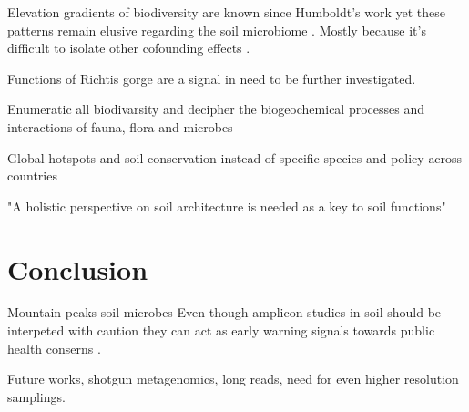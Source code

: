 \documentclass[unnumsec,webpdf,contemporary,large]{oup-authoring-template}%
\theoremstyle{thmstyleone}%
\theoremstyle{thmstyletwo}%
\theoremstyle{thmstylethree}%
\begin{document}
Elevation gradients of biodiversity are known since Humboldt's work \cite{Rahbek2019} 
yet these patterns remain elusive regarding the soil microbiome \cite{Looby2020, Siles2023}.
Mostly because it's difficult to isolate other cofounding effects \cite{Nottingham2018}. 

Functions of Richtis gorge are a signal in need to be further investigated.

Enumeratic all biodivarsity \cite{Anthony2023} and decipher the biogeochemical 
processes and interactions of fauna, flora and microbes \cite{Fry2019, Crowther2019,GRANDY201640,Delgado-Baquerizo2020}

Global hotspots \cite{Guerra2022}
and soil conservation instead of specific species \cite{Guerra2021}
and policy \cite{KONINGER2022} across countries \cite{Putten2023}

"A holistic perspective on soil architecture is needed as a key to soil functions"
\section{Conclusion}

Mountain peaks soil microbes \cite{Adamczyk2019}
Even though amplicon studies in soil should be interpeted with caution \cite{alteio2021} they 
can act as early warning signals towards public health conserns \cite{Banerjee2023}.

Future works, shotgun metagenomics, long reads, need for even higher resolution samplings. 




%
%
%
%
%
%
\end{document}
